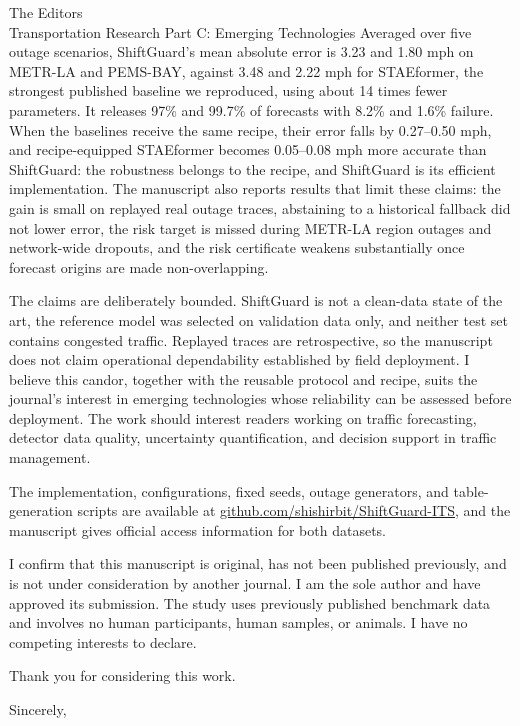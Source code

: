 \documentclass[10pt]{letter}
\begin{document}
\begin{letter}{The Editors\\
Transportation Research Part C: Emerging Technologies}
Averaged over five outage scenarios, ShiftGuard's mean absolute error is 3.23 and
1.80 mph on METR-LA and PEMS-BAY, against 3.48 and 2.22 mph for STAEformer, the
strongest published baseline we reproduced, using about 14 times fewer parameters.
It releases 97\% and 99.7\% of forecasts with 8.2\% and 1.6\% failure. When the
baselines receive the same recipe, their error falls by 0.27--0.50 mph, and
recipe-equipped STAEformer becomes 0.05--0.08 mph more accurate than ShiftGuard: the
robustness belongs to the recipe, and ShiftGuard is its efficient implementation. The
manuscript also reports results that limit these claims: the gain is small on
replayed real outage traces, abstaining to a historical fallback did not lower error,
the risk target is missed during METR-LA region outages and network-wide dropouts,
and the risk certificate weakens substantially once forecast origins are made
non-overlapping.

The claims are deliberately bounded. ShiftGuard is not a clean-data state of the
art, the reference model was selected on validation data only, and neither test
set contains congested traffic. Replayed traces are retrospective, so the manuscript
does not claim operational dependability established by field deployment. I believe this candor, together with the reusable protocol and
recipe, suits the journal's interest in emerging technologies whose
reliability can be assessed before deployment. The work should interest readers
working on traffic forecasting, detector data quality, uncertainty
quantification, and decision support in traffic management.

The implementation, configurations, fixed seeds, outage generators, and
table-generation scripts are available at
\href{https://github.com/shishirbit/ShiftGuard-ITS}{github.com/shishirbit/ShiftGuard-ITS},
and the manuscript gives official access information for both datasets.

I confirm that this manuscript is original, has not been published previously,
and is not under consideration by another journal. I am the sole author and
have approved its submission. The study uses previously published benchmark
data and involves no human participants, human samples, or animals. I have no
competing interests to declare.

Thank you for considering this work.

\closing{Sincerely,}

\end{letter}
\end{document}
